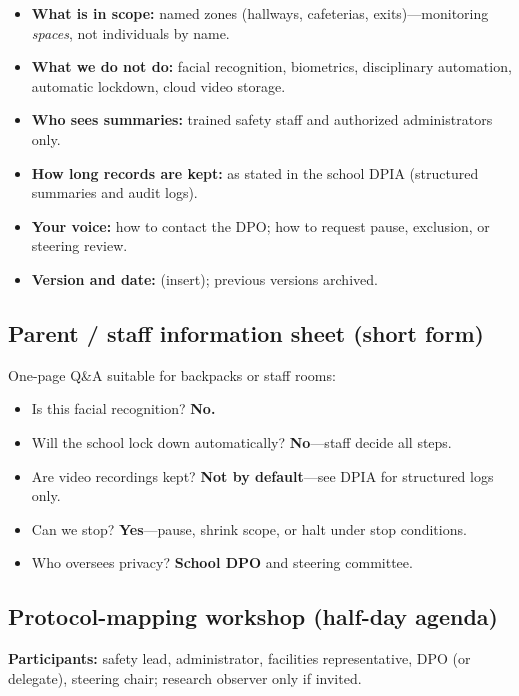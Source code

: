 \begin{itemize}[noitemsep]
  \item \textbf{What is in scope:} named zones (hallways, cafeterias, exits)---monitoring \emph{spaces},
        not individuals by name.
  \item \textbf{What we do not do:} facial recognition, biometrics, disciplinary automation,
        automatic lockdown, cloud video storage.
  \item \textbf{Who sees summaries:} trained safety staff and authorized administrators only.
  \item \textbf{How long records are kept:} as stated in the school DPIA (structured summaries and audit logs).
  \item \textbf{Your voice:} how to contact the DPO; how to request pause, exclusion, or steering review.
  \item \textbf{Version and date:} (insert); previous versions archived.
\end{itemize}

\subsection{Parent / staff information sheet (short form)}

One-page Q\&A suitable for backpacks or staff rooms:
\begin{itemize}[noitemsep]
  \item Is this facial recognition? \textbf{No.}
  \item Will the school lock down automatically? \textbf{No}---staff decide all steps.
  \item Are video recordings kept? \textbf{Not by default}---see DPIA for structured logs only.
  \item Can we stop? \textbf{Yes}---pause, shrink scope, or halt under stop conditions.
  \item Who oversees privacy? \textbf{School DPO} and steering committee.
\end{itemize}

\subsection{Protocol-mapping workshop (half-day agenda)}

\textbf{Participants:} safety lead, administrator, facilities representative, DPO (or delegate),
steering chair; research observer only if invited.

